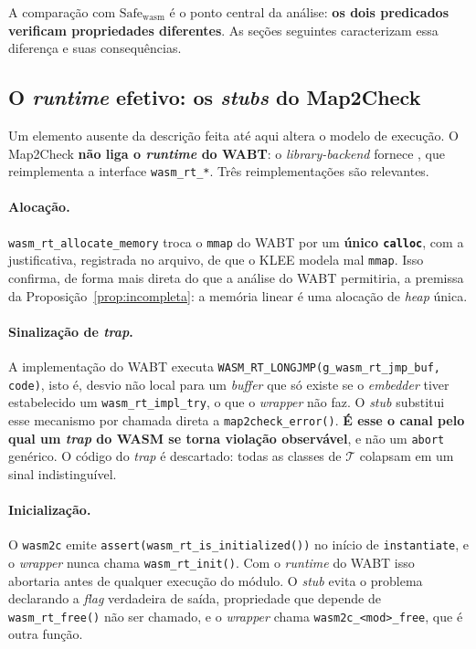 \documentclass[11pt,a4paper]{article}
\theoremstyle{definition}
\newcommand{\Safe}{\mathrm{Safe}}
\newcommand{\wasm}{\mathrm{wasm}}
\newcommand{\code}[1]{\texttt{#1}}
\begin{document}
A comparação com $\Safe_{\wasm}$ é o ponto central da análise:
\textbf{os dois predicados verificam propriedades diferentes}. As seções
seguintes caracterizam essa diferença e suas consequências.

\subsection{O \emph{runtime} efetivo: os \emph{stubs} do Map2Check}
\label{sec:stubs}

Um elemento ausente da descrição feita até aqui altera o modelo de execução. O
Map2Check \textbf{não liga o \emph{runtime} do WABT}: o \emph{library-backend}
fornece , que reimplementa a
interface \code{wasm\_rt\_*}. Três reimplementações são relevantes.

\paragraph{Alocação.}
\code{wasm\_rt\_allocate\_memory} troca o \code{mmap} do WABT por um
\textbf{único \code{calloc}}, com a justificativa, registrada no arquivo, de
que o KLEE modela mal \code{mmap}. Isso confirma, de forma mais direta do que a
análise do WABT permitiria, a premissa da Proposição~\ref{prop:incompleta}: a
memória linear é uma alocação de \emph{heap} única.

\paragraph{Sinalização de \emph{trap}.}
A implementação do WABT executa
\code{WASM\_RT\_LONGJMP(g\_wasm\_rt\_jmp\_buf, code)}, isto é, desvio não local
para um \emph{buffer} que só existe se o \emph{embedder} tiver estabelecido um
\code{wasm\_rt\_impl\_try}, o que o \emph{wrapper} não faz. O \emph{stub}
substitui esse mecanismo por chamada direta a \code{map2check\_error()}.
\textbf{É esse o canal pelo qual um \emph{trap} do WASM se torna violação
observável}, e não um \code{abort} genérico. O código do \emph{trap} é
descartado: todas as classes de $\mathcal{T}$ colapsam em um sinal indistinguível.

\paragraph{Inicialização.}
O \code{wasm2c} emite \code{assert(wasm\_rt\_is\_initialized())} no início de
\code{instantiate}, e o \emph{wrapper} nunca chama \code{wasm\_rt\_init()}. Com o
\emph{runtime} do WABT isso abortaria antes de qualquer execução do módulo. O
\emph{stub} evita o problema declarando a \emph{flag} verdadeira de saída,
propriedade que depende de \code{wasm\_rt\_free()} não ser chamado, e o
\emph{wrapper} chama \code{wasm2c\_<mod>\_free}, que é outra função.
\end{document}
